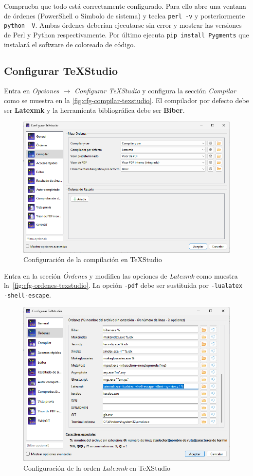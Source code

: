 Comprueba que todo está correctamente configurado.  Para ello abre una ventana de órdenes (PowerShell o Símbolo de sistema) y teclea \texttt{perl -v} y posteriormente \texttt{python -V}. Ambas órdenes deberían ejecutarse sin error y mostrar las versiones de Perl y Python respectivamente. Por último ejecuta \texttt{pip install Pygments} que instalará el software de coloreado de código.

\subsection{Configurar TeXStudio}

Entra en \emph{Opciones $\rightarrow$ Configurar TeXStudio} y configura la sección \emph{Compilar} como se muestra en la \autoref{fig:cfg-compilar-texstudio}. El compilador por defecto debe ser \textbf{Latexmk} y la herramienta bibliográfica debe ser \textbf{Biber}.

\begin{figure}
    \centering
    \includegraphics[width=.7\textwidth]{fig/cfg-texstudio-compilar.png}
    \caption{Configuración de la compilación en TeXStudio}
    \label{fig:cfg-compilar-texstudio}
\end{figure}

Entra en la sección \emph{Órdenes} y modifica las opciones de \emph{Latexmk} como muestra la~\autoref{fig:cfg-ordenes-texstudio}. La opción \texttt{-pdf} debe ser sustituida por \texttt{-lualatex -shell-escape}.

\begin{figure}
    \centering
    \includegraphics[width=.7\textwidth]{fig/cfg-texstudio-ordenes.png}
    \caption{Configuración de la orden \emph{Latexmk} en TeXStudio}
    \label{fig:cfg-ordenes-texstudio}
\end{figure}

